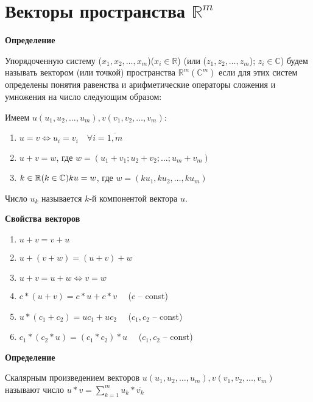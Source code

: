 \documentclass{article}
\newcommand{\parspace}{\vspace{10pt}}
\begin{document}
\section{Векторы пространства $\mathbb{R}^m$}

\textbf{Определение}

Упорядоченную систему ($x_1, x_2, \dots, x_m$)($x_i \in \mathbb{R}$)
(или ($z_1, z_2, \dots, z_m$); $z_i \in \mathbb{C}$) будем называть вектором
(или точкой) пространства $\mathbb{R}^m (\mathbb{C}^m)$ если для этих
систем определены понятия равенства и арифметические операторы сложения
и умножения на число следующим образом:

Имеем $u(u_1, u_2, \dots, u_m), v(v_1, v_2, \dots, v_m)$:

\begin{enumerate}
    \item $u = v \Leftrightarrow u_i = v_i \quad \forall i = \overline{1, m}$
    \item $u + v = w$, где $w = (u_1 + v_1; u_2 + v_2; \dots; u_m + v_m)$
    \item $k \in \mathbb{R} (k \in \mathbb{C}) \\
    ku = w$, где $w = (k u_1, k u_2, \dots, k u_m)$
\end{enumerate}

Число $u_k$ называется $k$-й компонентой вектора $u$.

\pagebreak

\textbf{Свойства векторов}

\begin{enumerate}
    \item $u + v = v + u$
    \item $u + (v + w) = (u + v) + w$
    \item $u + v = u + w \Leftrightarrow v = w$
    \item $c * (u + v) = c * u + c * v \quad$ ($c$ -- const)
    \item $u * (c_1 + c_2) = u c_1 + u c_2 \quad$ ($c_1, c_2$ -- const)
    \item $c_1 * (c_2 * u) = (c_1 * c_2) * u \quad$ ($c_1, c_2$ -- const)
\end{enumerate}

\parspace

\textbf{Определение}

Скалярным произведением векторов $u(u_1, u_2, \dots, u_m), v(v_1, v_2, \dots, v_m)$
называют число $u * v = \displaystyle\sum_{k = 1}^{m} u_k * \overline{v_k}$

\parspace
\end{document}
